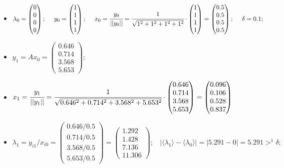 \begin{itemize}
    \item
    $\lambda_0 =
    \begin{pmatrix}
        0\\0\\0\\0
    \end{pmatrix};~~~~
    y_0 =
    \begin{pmatrix}
        1\\1\\1\\1
    \end{pmatrix};~~~~
    x_0 = \cfrac{y_0}{||y_0||} = \cfrac{1}{\sqrt{1^2+1^2+1^2+1^2}}\cdot
    \begin{pmatrix}
        1\\1\\1\\1
    \end{pmatrix} =
    \begin{pmatrix}
        0.5\\0.5\\0.5\\0.5
    \end{pmatrix};~~~~
    \delta = 0.1;$



    \item
    $y_1 = Ax_0 =
    \begin{pmatrix}
        0.646\\0.714\\3.568\\5.653
    \end{pmatrix};$

    \item
    $x_1 = \cfrac{y_1}{||y_1||} = \cfrac{1}{\sqrt{0.646^2+0.714^2+3.568^2+5.653^2}}\cdot
    \begin{pmatrix}
        0.646\\0.714\\3.568\\5.653
    \end{pmatrix} =
    \begin{pmatrix}
        0.096\\0.106\\0.528\\0.837
    \end{pmatrix}$

    \item
    $\lambda_1 = y_{i1} / x_{i0} =
    \begin{pmatrix}
        0.646/0.5\\
        0.714/0.5\\
        3.568/0.5\\
        5.653/0.5
    \end{pmatrix} =
    \begin{pmatrix}
        1.292\\1.428\\7.136\\11.306
    \end{pmatrix};~~~~
    |\langle\lambda_1\rangle-\langle\lambda_0\rangle| = |5.291-0| = 5.291 >^1 \delta;$





\end{itemize}
